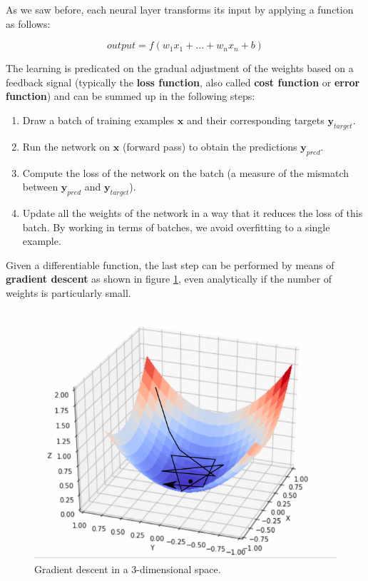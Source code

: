 As we saw before, each neural layer transforms its input by applying a function as follows:

\begin{equation*}
    output = f(w_1 x_1 + ... + w_n x_n + b)
\end{equation*}

The learning is predicated on the gradual adjustment of the weights based on a feedback signal (typically the \textbf{loss function}, also called \textbf{cost function} or \textbf{error function}) and can be summed up in the following steps:

\begin{enumerate}
    \item Draw a batch of training examples $\boldsymbol{x}$ and their corresponding targets $\boldsymbol{y}_{target}$.
    \item Run the network on $\boldsymbol{x}$ (forward pass) to obtain the predictions $\boldsymbol{y}_{pred}$.
    \item Compute the loss of the network on the batch (a measure of the mismatch between $\boldsymbol{y}_{pred}$ and $\boldsymbol{y}_{target}$).
    \item Update all the weights of the network in a way that it reduces the loss of this batch. By working in terms of batches, we avoid overfitting to a single example. 
\end{enumerate}

Given a differentiable function, the last step can be performed by means of \textbf{gradient descent} as shown in figure \ref{fig:ch6-gradientdescent}, even analytically if the number of weights is particularly small.

\begin{figure}[hb]
    \centering
    \includegraphics[scale=0.15]{Images/Chapter 6/gradient-descent.png}
    \caption{Gradient descent in a 3-dimensional space.}
    \label{fig:ch6-gradientdescent}
\end{figure}

